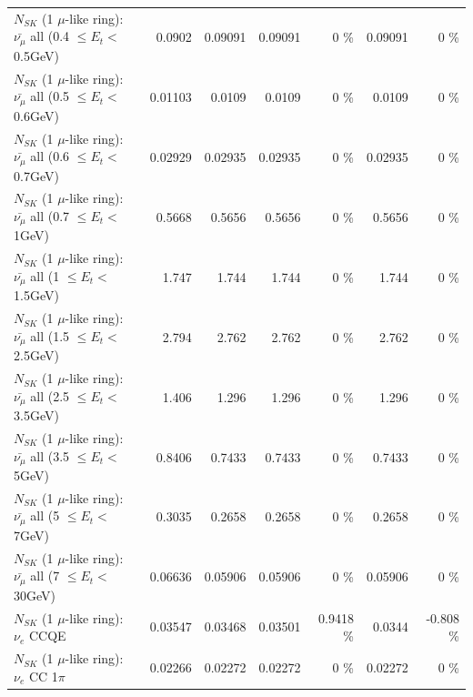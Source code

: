 \begin{table}
\begin{tabular}{| l | r | r | r  r | r  r |}
 $N_{SK}$ (1 $\mu$-like ring): $\bar{\nu_{\mu}}$ all (0.4 $\leq E_{t} <$ 0.5GeV) &          0.0902 &         0.09091 &         0.09091 &        0 \%  &         0.09091 &        0 \%  \\ 
 $N_{SK}$ (1 $\mu$-like ring): $\bar{\nu_{\mu}}$ all (0.5 $\leq E_{t} <$ 0.6GeV) &         0.01103 &          0.0109 &          0.0109 &        0 \%  &          0.0109 &        0 \%  \\ 
 $N_{SK}$ (1 $\mu$-like ring): $\bar{\nu_{\mu}}$ all (0.6 $\leq E_{t} <$ 0.7GeV) &         0.02929 &         0.02935 &         0.02935 &        0 \%  &         0.02935 &        0 \%  \\ 
   $N_{SK}$ (1 $\mu$-like ring): $\bar{\nu_{\mu}}$ all (0.7 $\leq E_{t} <$ 1GeV) &          0.5668 &          0.5656 &          0.5656 &        0 \%  &          0.5656 &        0 \%  \\ 
   $N_{SK}$ (1 $\mu$-like ring): $\bar{\nu_{\mu}}$ all (1 $\leq E_{t} <$ 1.5GeV) &           1.747 &           1.744 &           1.744 &        0 \%  &           1.744 &        0 \%  \\ 
 $N_{SK}$ (1 $\mu$-like ring): $\bar{\nu_{\mu}}$ all (1.5 $\leq E_{t} <$ 2.5GeV) &           2.794 &           2.762 &           2.762 &        0 \%  &           2.762 &        0 \%  \\ 
 $N_{SK}$ (1 $\mu$-like ring): $\bar{\nu_{\mu}}$ all (2.5 $\leq E_{t} <$ 3.5GeV) &           1.406 &           1.296 &           1.296 &        0 \%  &           1.296 &        0 \%  \\ 
   $N_{SK}$ (1 $\mu$-like ring): $\bar{\nu_{\mu}}$ all (3.5 $\leq E_{t} <$ 5GeV) &          0.8406 &          0.7433 &          0.7433 &        0 \%  &          0.7433 &        0 \%  \\ 
     $N_{SK}$ (1 $\mu$-like ring): $\bar{\nu_{\mu}}$ all (5 $\leq E_{t} <$ 7GeV) &          0.3035 &          0.2658 &          0.2658 &        0 \%  &          0.2658 &        0 \%  \\ 
    $N_{SK}$ (1 $\mu$-like ring): $\bar{\nu_{\mu}}$ all (7 $\leq E_{t} <$ 30GeV) &         0.06636 &         0.05906 &         0.05906 &        0 \%  &         0.05906 &        0 \%  \\ 
\hline
\hline
\hline
                                      $N_{SK}$ (1 $\mu$-like ring): $\nu_e$ CCQE &         0.03547 &         0.03468 &         0.03501 &   0.9418 \%  &          0.0344 &   -0.808 \%  \\ 
                                 $N_{SK}$ (1 $\mu$-like ring): $\nu_e$ CC 1$\pi$ &         0.02266 &         0.02272 &         0.02272 &        0 \%  &         0.02272 &        0 \%  \\ 

\end{tabular}
\end{table}
